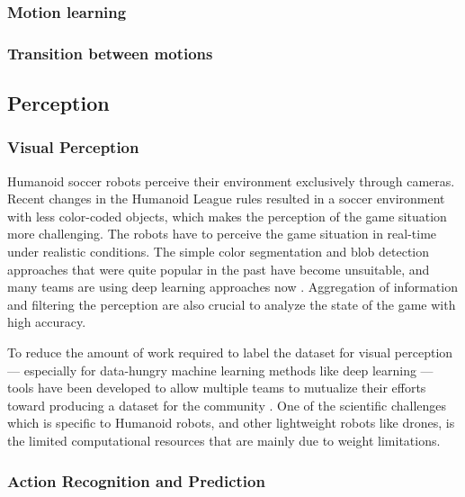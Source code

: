 \documentclass{article}
\begin{document}
\subsubsection{Motion learning}

\subsubsection{Transition between motions}

\subsection{Perception}
\subsubsection{Visual Perception}
Humanoid soccer robots perceive their environment exclusively through cameras. 
Recent changes in the Humanoid League rules resulted in a soccer environment with less color-coded objects, which makes the perception of the game situation more challenging.
The robots have to perceive the game situation in real-time under realistic conditions.
The simple color segmentation and blob detection approaches that were quite popular in the past \cite{Farazi2015} have become unsuitable, and many teams are using deep learning approaches now \cite{ficht2018nimbro} \cite{schnekenburger2017detection}. 
Aggregation of information and filtering the perception are also crucial to analyze the state of the game with high accuracy.

To reduce the amount of work required to label the dataset for visual perception --- especially for data-hungry machine learning methods like deep learning --- tools have been developed to allow multiple teams to mutualize their efforts toward producing a dataset for the community \cite{imagetagger2018}.
One of the scientific challenges which is specific to Humanoid robots, and other lightweight robots like drones, is the limited computational resources that are mainly due to weight limitations. 


\subsubsection{Action Recognition and Prediction}
\end{document}

